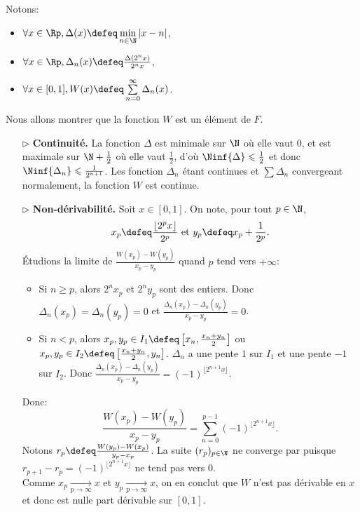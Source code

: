 \begin{preuve}
    Notons:
    \begin{itemize}
        \item $\forall x \in \Rp, \Delta(x) \defeq \min\limits_{n \in \N} |x - n|$,
        \item $\forall x \in \Rp, \Delta_n(x) \defeq \frac{\Delta(2^n x)}{2^n x}$,
        \item $\forall x \in [0, 1], W(x) \defeq \sum\limits_{n=0}^\infty \Delta_n(x)$.
    \end{itemize}
    Nous allons montrer que la fonction $W$ est un élément de $F$.
    \begin{itemize}
    \item[$\rhd$] \textbf{Continuité.} La fonction $\Delta$ est minimale sur $\N$ où elle vaut $0$, et est maximale sur $\N + \frac{1}{2}$ où elle vaut $\frac{1}{2}$, d'où $\Ninf{\Delta} \leqslant \frac{1}{2}$ et donc $\Ninf{\Delta_n} \leqslant \frac{1}{2^{n+1}}$. Les fonction $\Delta_n$ étant continues et $\sum \Delta_n$ convergeant normalement, la fonction $W$ est continue. 
    \item[$\rhd$] \textbf{Non-dérivabilité.} Soit $x \in [0, 1]$. On note, pour tout $p \in \N$, 
    $$x_p \defeq \frac{\lfloor 2^p x \rfloor}{2^p} \text{ et } y_p \defeq x_p + \frac{1}{2^p}.$$ 
    Étudions la limite de $\frac{W(x_p) - W(y_p)}{x_p - y_p}$ quand $p$ tend vers $+ \infty$:
    \begin{itemize}
        \item Si $n \geqslant p$, alors $2^n x_p$ et $2^n y_p$ sont des entiers. Donc $\Delta_n(x_p) = \Delta_n(y_p) = 0$ et $\frac{\Delta_n(x_p) - \Delta_n(y_p)}{x_p - y_p} = 0$.
        \item Si $n < p$, alors $x_p, y_p \in I_1 \defeq \left[ x_n, \frac{x_n + y_n}{2} \right]$ ou $x_p, y_p \in I_2 \defeq \left[ \frac{x_n + y_n}{2}, y_n \right]$. $\Delta_n$ a une pente $1$ sur $I_1$ et une pente $-1$ sur $I_2$. Donc $\frac{\Delta_n(x_p) - \Delta_n(y_p)}{x_p - y_p} = (-1)^{\lfloor 2^{n+1} x \rfloor}$. 
    \end{itemize}
    Donc:
    $$\frac{W(x_p) - W(y_p)}{x_p - y_p} = \sum_{n=0}^{p-1} (-1)^{\lfloor 2^{n+1} x \rfloor}.$$
    Notons $r_p \defeq \frac{W(y_p) - W(x_p)}{y_p - x_p}$. La suite $(r_p)_{p \in \N}$ ne converge par puisque $r_{p+1} - r_p = (-1)^{\lfloor 2^{n+1} x \rfloor}$ ne tend pas vers $0$. \\
    Comme $x_p \xrightarrow[p \to \infty]{} x$ et $y_p \xrightarrow[p \to \infty]{} x$, on en conclut que $W$ n'est pas dérivable en $x$ et donc est nulle part dérivable sur $[0, 1]$.
    \end{itemize}
\end{preuve}

